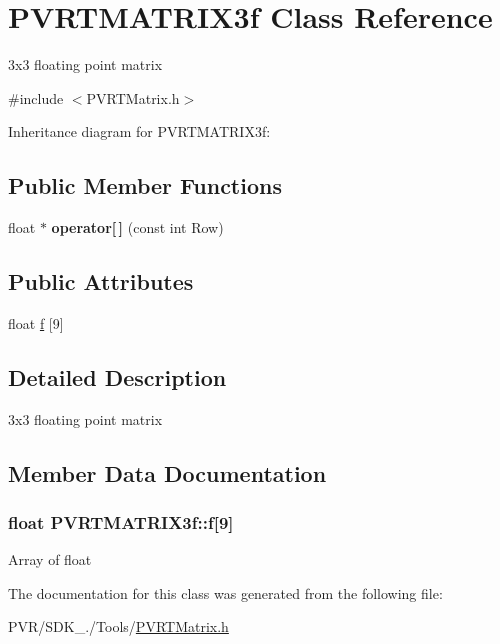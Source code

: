 \hypertarget{class_p_v_r_t_m_a_t_r_i_x3f}{\section{P\+V\+R\+T\+M\+A\+T\+R\+I\+X3f Class Reference}
\label{class_p_v_r_t_m_a_t_r_i_x3f}
}


3x3 floating point matrix  




{\ttfamily \#include $<$P\+V\+R\+T\+Matrix.\+h$>$}



Inheritance diagram for P\+V\+R\+T\+M\+A\+T\+R\+I\+X3f\+:
\subsection*{Public Member Functions}
\begin{DoxyCompactItemize}
\item 
\hypertarget{class_p_v_r_t_m_a_t_r_i_x3f_a6d2b1101c6bc1dce7fcd5b8a71fefd58}{float $\ast$ {\bfseries operator\mbox{[}$\,$\mbox{]}} (const int Row)}\label{class_p_v_r_t_m_a_t_r_i_x3f_a6d2b1101c6bc1dce7fcd5b8a71fefd58}

\end{DoxyCompactItemize}
\subsection*{Public Attributes}
\begin{DoxyCompactItemize}
\item 
float \hyperlink{class_p_v_r_t_m_a_t_r_i_x3f_a408b3177ed9af195f5a59d570020f4f1}{f} \mbox{[}9\mbox{]}
\end{DoxyCompactItemize}


\subsection{Detailed Description}
3x3 floating point matrix 



 

\subsection{Member Data Documentation}
\hypertarget{class_p_v_r_t_m_a_t_r_i_x3f_a408b3177ed9af195f5a59d570020f4f1}{
\subsubsection[{f}]{\setlength{\rightskip}{0pt plus 5cm}float P\+V\+R\+T\+M\+A\+T\+R\+I\+X3f\+::f\mbox{[}9\mbox{]}}}\label{class_p_v_r_t_m_a_t_r_i_x3f_a408b3177ed9af195f5a59d570020f4f1}
Array of float 

The documentation for this class was generated from the following file\+:\begin{DoxyCompactItemize}
\item 
P\+V\+R/\+S\+D\+K\+\_./\+Tools/\hyperlink{_p_v_r_t_matrix_8h}{P\+V\+R\+T\+Matrix.\+h}\end{DoxyCompactItemize}
